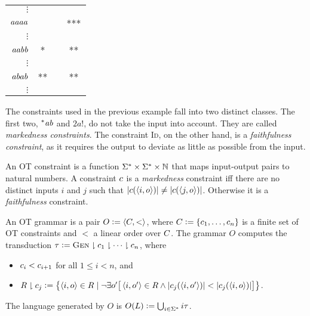 \begin{examplebox}
\begin{center}
\begin{tabular}{rccc}
            $\vdots$ & & & \\
            $\mathit{aaaa}$ & & & ***\\
            $\vdots$ & & \\
            $\mathit{aabb}$ & * & & **\\
            $\vdots$ & & \\
            $\mathit{abab}$ & ** & & **\\
            $\vdots$ & & \\
            \bottomrule
        \end{tabular}
    \end{center}
\end{examplebox}

The constraints used in the previous example fall into two distinct classes. 
The first two, $^*\mathit{ab}$ and $2a!$, do not take the input into account. 
They are called \emph{markedness constraints}.
The constraint \textsc{Id}, on the other hand, is a \emph{faithfulness constraint}, as it requires the output to deviate as little as possible from the input.
%
\begin{definition}[OT Constraints]
    An OT constraint is a function $\Sigma^* \times  \Sigma^* \times \mathbb{N}$ that maps input-output pairs to natural numbers.
    A constraint $c$ is a \emph{markedness} constraint iff there are no distinct inputs $i$ and $j$ such that $| c(\left \langle i,o \right \rangle ) | \neq | c(\left \langle j,o \right \rangle ) |$.
    Otherwise it is a \emph{faithfulness} constraint.
\end{definition}

\begin{definition}
    An OT grammar is a pair $O \mathrel{\mathop:}= \left \langle C, < \right \rangle $, where $C \mathrel{\mathop:}= \left \{ c_1, \ldots, c_n \right \}$ is a finite set of OT constraints and $<$ a linear order over $C$.
    The grammar $O$ computes the transduction $\tau\mathrel{\mathop:}= \textsc{Gen} \downharpoonright c_1 \downharpoonright \cdots \downharpoonright c_n$, where
    \begin{itemize}
        \item $c_i < c_{i+1}$ for all $1 \leq i < n$, and
        \item $R \downharpoonright c_j \mathrel{\mathop:}= \left \{  \left \langle i,o \right \rangle  \in R \mid \neg \exists o' \big [ \left \langle i,o' \right \rangle  \in R \wedge | c_j(\left \langle i,o' \right \rangle ) | < | c_j(\left \langle i,o \right \rangle ) | \big ]  \right \}$.
    \end{itemize}
    The language generated by $O$ is $O(L) \mathrel{\mathop:}= \bigcup_{i \in \Sigma^*} i\tau$.
\end{definition}

